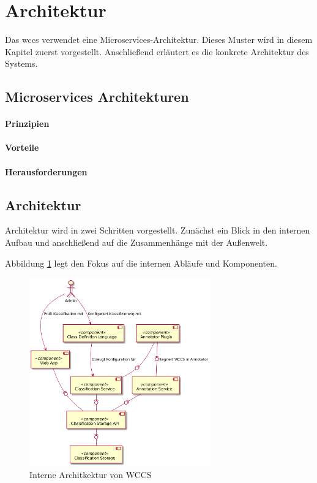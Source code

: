 \section{Architektur}
    \label{section:Architecture}
    Das \gls{wccs} verwendet eine Microservices-Architektur.
    Dieses Muster wird in diesem Kapitel zuerst vorgestellt.
    Anschließend erläutert es die konkrete Architektur des Systems.

    \subsection{Microservices Architekturen}
        \paragraph{Prinzipien}
        \paragraph{Vorteile}
        \paragraph{Herausforderungen}

    \subsection{Architektur}
        Architektur wird in zwei Schritten vorgestellt.
        Zunächst ein Blick in den internen Aufbau und anschließend auf die Zusammenhänge mit der Außenwelt.
        
        Abbildung \ref{image:wccsInternalArchitecture} legt den Fokus auf die
        internen Abläufe und Komponenten.

        \begin{figure}
            \centering
            \includegraphics[width=0.7\textwidth]{../resources/architecture/wccs_internal_architecture.png}
            \caption{Interne Architkektur von WCCS}
            \label{image:wccsInternalArchitecture}
        \end{figure}

